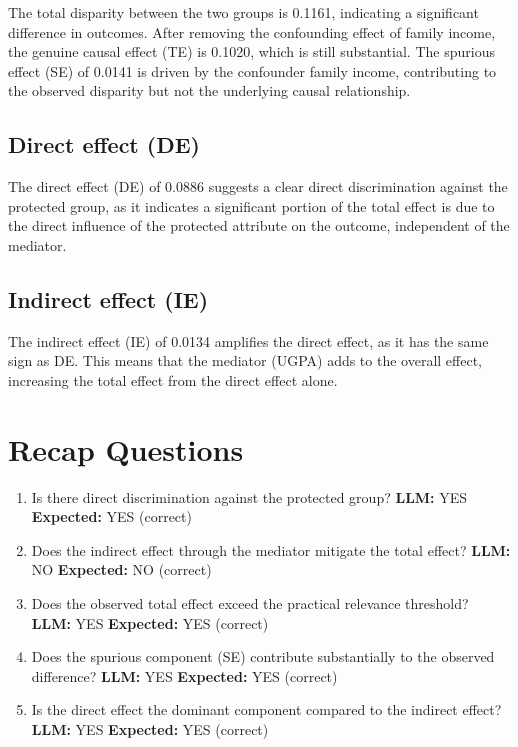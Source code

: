 \documentclass[11pt]{article}
\begin{document}
The total disparity between the two groups is 0.1161, indicating a significant difference in outcomes. After removing the confounding effect of family income, the genuine causal effect (TE) is 0.1020, which is still substantial. The spurious effect (SE) of 0.0141 is driven by the confounder family income, contributing to the observed disparity but not the underlying causal relationship.

\subsection{Direct effect (DE)}

The direct effect (DE) of 0.0886 suggests a clear direct discrimination against the protected group, as it indicates a significant portion of the total effect is due to the direct influence of the protected attribute on the outcome, independent of the mediator.

\subsection{Indirect effect (IE)}

The indirect effect (IE) of 0.0134 amplifies the direct effect, as it has the same sign as DE. This means that the mediator (UGPA) adds to the overall effect, increasing the total effect from the direct effect alone.

\section{Recap Questions}

\begin{enumerate}
\item Is there direct discrimination against the protected group? \textbf{LLM:} YES \quad \textbf{Expected:} YES \quad (correct)
\item Does the indirect effect through the mediator mitigate the total effect? \textbf{LLM:} NO \quad \textbf{Expected:} NO \quad (correct)
\item Does the observed total effect exceed the practical relevance threshold? \textbf{LLM:} YES \quad \textbf{Expected:} YES \quad (correct)
\item Does the spurious component (SE) contribute substantially to the observed difference? \textbf{LLM:} YES \quad \textbf{Expected:} YES \quad (correct)
\item Is the direct effect the dominant component compared to the indirect effect? \textbf{LLM:} YES \quad \textbf{Expected:} YES \quad (correct)
\end{enumerate}
\end{document}
